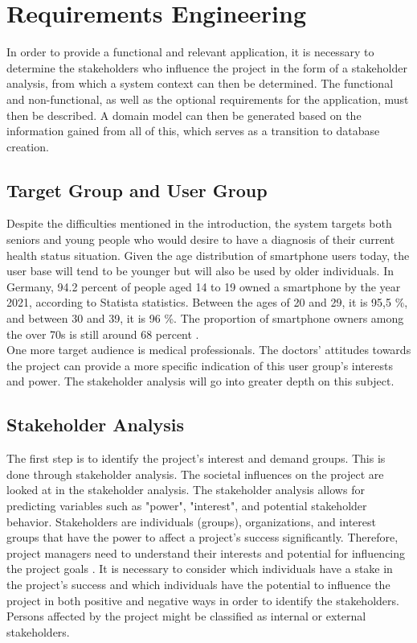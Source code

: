 
\chapter{Requirements Engineering}
In order to provide a functional and relevant application, it is necessary to determine the stakeholders who influence the project in the form of a stakeholder analysis, from which a system context can then be determined. The functional and non-functional, as well as the optional requirements for the application, must then be described. A domain model can then be generated based on the information gained from all of this, which serves as a transition to database creation.

\section{Target Group and User Group}
Despite the difficulties mentioned in the introduction, the system targets both seniors and young people who would desire to have a diagnosis of their current health status situation. Given the age distribution of smartphone users today, the user base will tend to be younger but will also be used by older individuals. In Germany, 94.2 percent of people aged 14 to 19 owned a smartphone by the year 2021, according to Statista statistics. Between the ages of 20 and 29, it is 95,5 \%, and between 30 and 39, it is 96 \%. The proportion of smartphone owners among the over 70s is still around 68 percent \cite{.smartphonenutzer}.
\newline \\
One more target audience is medical professionals. The doctors' attitudes towards the project can provide a more specific indication of this user group's interests and power. The stakeholder analysis will go into greater depth on this subject. 

\section{Stakeholder Analysis}
The first step is to identify the project's interest and demand groups. This is done through stakeholder analysis. The societal influences on the project are looked at in the stakeholder analysis. The stakeholder analysis allows for predicting variables such as "power", "interest", and potential stakeholder behavior. Stakeholders are individuals (groups), organizations, and interest groups that have the power to affect a project's success significantly. Therefore, project managers need to understand their interests and potential for influencing the project goals \cite[p. 28]{.stakeholder}. It is necessary to consider which individuals have a stake in the project's success and which individuals have the potential to influence the project in both positive and negative ways in order to identify the stakeholders. Persons affected by the project might be classified as internal or external stakeholders. 

